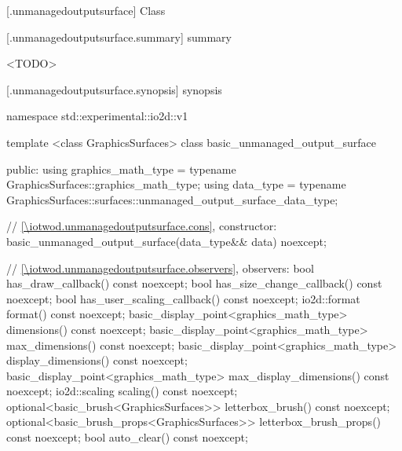  [\iotwod.unmanagedoutputsurface] {Class }

 [\iotwod.unmanagedoutputsurface.summary] { summary}

\pnum
{}%
<TODO>

 [\iotwod.unmanagedoutputsurface.synopsis] { synopsis}

\begin{codeblock}
namespace std::experimental::io2d::v1 {
  template <class GraphicsSurfaces>
  class basic_unmanaged_output_surface {
  public:
    using graphics_math_type = typename GraphicsSurfaces::graphics_math_type;
    using data_type = typename GraphicsSurfaces::surfaces::unmanaged_output_surface_data_type;

    // \ref{\iotwod.unmanagedoutputsurface.cons}, constructor:
    basic_unmanaged_output_surface(data_type&& data) noexcept;
	
    // \ref{\iotwod.unmanagedoutputsurface.observers}, observers:
    bool has_draw_callback() const noexcept;
    bool has_size_change_callback() const noexcept;
    bool has_user_scaling_callback() const noexcept;
    io2d::format format() const noexcept;
    basic_display_point<graphics_math_type> dimensions() const noexcept;
    basic_display_point<graphics_math_type> max_dimensions() const noexcept;
    basic_display_point<graphics_math_type> display_dimensions() const noexcept;
    basic_display_point<graphics_math_type> max_display_dimensions() const noexcept;
    io2d::scaling scaling() const noexcept;
    optional<basic_brush<GraphicsSurfaces>> letterbox_brush() const noexcept;
    optional<basic_brush_props<GraphicsSurfaces>> letterbox_brush_props() const noexcept;
    bool auto_clear() const noexcept;

}}
\end{codeblock}
